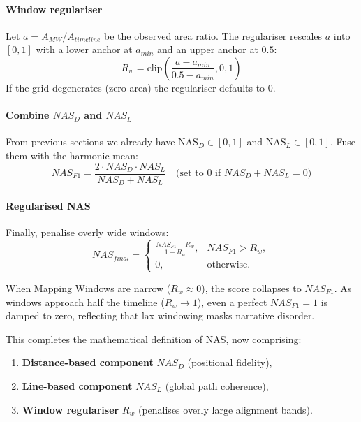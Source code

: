 \documentclass[main.tex]{subfiles}
\begin{document}
\paragraph{Window regulariser}
Let $a = A_{MW}/A_{timeline}$ be the observed area ratio. The regulariser rescales $a$ into $[0,1]$ with a lower anchor at $a_{min}$ and an upper anchor at $0.5$:
\begin{equation}
R_w = \text{clip}\left(\frac{a - a_{min}}{0.5 - a_{min}}, 0, 1\right)
\end{equation}
If the grid degenerates (zero area) the regulariser defaults to 0.

\paragraph{Combine $NAS_D$ and $NAS_L$}
From previous sections we already have $\text{NAS}_D \in [0,1]$ and $\text{NAS}_L \in [0,1]$. Fuse them with the harmonic mean:
\begin{equation}
NAS_{F1} = \frac{2 \cdot NAS_D \cdot NAS_L}{NAS_D + NAS_L} \quad \text{(set to 0 if } NAS_D + NAS_L = 0\text{)}
\end{equation}

\paragraph{Regularised NAS}
Finally, penalise overly wide windows:
\begin{equation}
\boxed{NAS_{final} = \begin{cases}
\frac{NAS_{F1} - R_w}{1 - R_w}, & NAS_{F1} > R_w, \\
0, & \text{otherwise}.
\end{cases}}
\end{equation}

When Mapping Windows are narrow ($R_w \approx 0$), the score collapses to $NAS_{F1}$. As windows approach half the timeline ($R_w \to 1$), even a perfect $NAS_{F1} = 1$ is damped to zero, reflecting that lax windowing masks narrative disorder.

This completes the mathematical definition of NAS, now comprising:
\begin{enumerate}
\item \textbf{Distance-based component} $NAS_D$ (positional fidelity),
\item \textbf{Line-based component} $NAS_L$ (global path coherence),
\item \textbf{Window regulariser} $R_w$ (penalises overly large alignment bands).
\end{enumerate}
\end{document}

